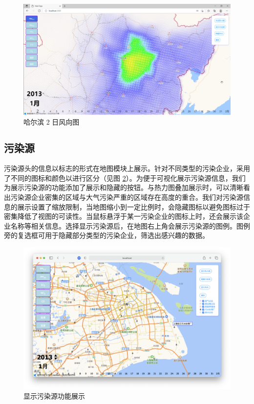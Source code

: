 \documentclass[UTF8]{ctexrep}
\begin{document}
    \begin{figure}[h!]
        \centering
        \includegraphics[width=15cm,keepaspectratio]{images/wind_map2.png}
        \caption{哈尔滨 2 日风向图}
        \label{fig:wind_map2}
    \end{figure}


    \subsection{污染源}

    污染源头的信息以标志的形式在地图模块上展示。针对不同类型的污染企业，采用了不同的图标和颜色以进行区分（见图 \ref{fig:pollution_source_demo1}）。为便于可视化展示污染源信息，我们为展示污染源的功能添加了展示和隐藏的按钮。与热力图叠加展示时，可以清晰看出污染源企业密集的区域与大气污染严重的区域存在高度的重合。我们对污染源信息的展示设置了缩放限制，当地图缩小到一定比例时，会隐藏图标以避免图标过于密集降低了视图的可读性。当鼠标悬浮于某一污染企业的图标上时，还会展示该企业名称等相关信息。选择显示污染源后，在地图右上角会展示污染源的图例。图例旁的复选框可用于隐藏部分类型的污染企业，筛选出感兴趣的数据。\\

    \begin{figure}[h!]
        \centering
        \includegraphics[width=15cm,keepaspectratio]{images/pollution_source_demo1.png}
        \caption{显示污染源功能展示}
        \label{fig:pollution_source_demo1}
    \end{figure}
\end{document}
